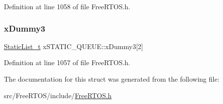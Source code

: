 Definition at line 1058 of file Free\+R\+T\+O\+S.\+h.

\mbox{\label{structx_s_t_a_t_i_c___q_u_e_u_e_add0de93e08b632124122850bcd543597}} 
\subsubsection{\texorpdfstring{x\+Dummy3}{xDummy3}}
{\footnotesize\ttfamily \hyperlink{_free_r_t_o_s_8h_a9735ad9101a2bd25f83a62089a4acee6}{Static\+List\+\_\+t} x\+S\+T\+A\+T\+I\+C\+\_\+\+Q\+U\+E\+U\+E\+::x\+Dummy3\mbox{[}2\mbox{]}}



Definition at line 1057 of file Free\+R\+T\+O\+S.\+h.



The documentation for this struct was generated from the following file\+:\begin{DoxyCompactItemize}
\item 
src/\+Free\+R\+T\+O\+S/include/\hyperlink{_free_r_t_o_s_8h}{Free\+R\+T\+O\+S.\+h}\end{DoxyCompactItemize}
